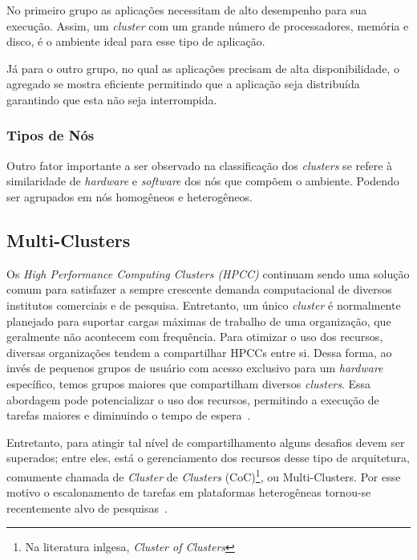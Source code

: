 \documentclass[12pt]{report} %
\begin{document}
		No primeiro grupo as aplicações necessitam de alto desempenho para sua execução.
		Assim, um \textit{cluster} com um grande número de processadores, memória e disco, é o ambiente ideal para esse tipo de aplicação.
		
		Já para o outro grupo, no qual as aplicações precisam de alta disponibilidade, o agregado se mostra eficiente permitindo que a aplicação seja distribuída garantindo que esta não seja interrompida.
	    
	    \subsubsection{Tipos de Nós}
	    Outro fator importante a ser observado na classificação dos \textit{clusters} se refere à similaridade de \textit{hardware} e \textit{software} dos nós que compõem o ambiente.
	    Podendo ser agrupados em nós homogêneos e heterogêneos.	    
    

	\subsection{Multi-Clusters}
	    Os \textit{High Performance Computing Clusters (HPCC)} continuam sendo uma solução comum para satisfazer a sempre crescente demanda computacional de diversos institutos comerciais e de pesquisa.
	    Entretanto, um único \textit{cluster} é normalmente planejado para suportar cargas máximas de trabalho de uma organização, que geralmente não acontecem com frequência.
	    Para otimizar o uso dos recursos, diversas organizações tendem a compartilhar HPCCs entre si.
	    Dessa forma, ao invés de pequenos grupos de usuário com acesso exclusivo para um \textit{hardware} específico, temos grupos maiores que compartilham diversos \textit{clusters}.
	    Essa abordagem pode potencializar o uso dos recursos, permitindo a execução de tarefas maiores e diminuindo o tempo de espera~\cite{Bauer06}.

	    Entretanto, para atingir tal nível de compartilhamento alguns desafios devem ser superados;
	    entre eles, está o gerenciamento dos recursos desse tipo de arquitetura, comumente chamada de \textit{Cluster} de \textit{Clusters} (CoC)\footnote{Na literatura inlgesa, \textit{Cluster of Clusters}}, ou Multi-Clusters.
	    Por esse motivo o escalonamento de tarefas em plataformas heterogêneas tornou-se recentemente alvo de pesquisas~\cite{Rauuber07}.
\end{document}
